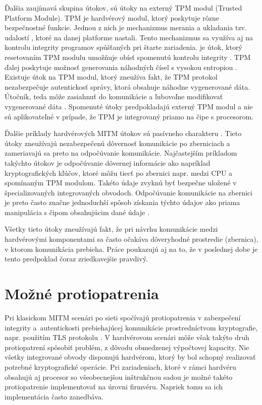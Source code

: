 Ďalšia zaujímavá skupina útokov, sú útoky na externý TPM modul (Trusted Platform Module). TPM je hardvérový modul, ktorý poskytuje rôzne bezpečnostné funkcie. Jednou z nich je mechanizmus merania a ukladania tzv. udalostí \cite{tpmArch}, ktoré na danej platforme nastali. Tento mechanizmus sa využíva aj na kontrolu integrity programov spúšťaných pri štarte zariadenia.  je útok, ktorý resetovaním TPM modulu umožňuje obísť spomenutú kontrolu integrity \cite{mitmTPM}. TPM ďalej poskytuje možnosť generovania náhodných čísel s vysokou entropiou \cite{tpmArch}. Existuje útok na TPM modul, ktorý zneužíva fakt, že TPM protokol nezabezpečuje autentickosť správy, ktorá obsahuje náhodne vygenerované dáta. Útočník, teda môže zasiahnuť do komunikácie a ľubovoľne modifikovať vygenerované dáta \cite{mitmTPM}. Spomenuté útoky predpokladajú externý TPM modul a nie sú aplikovateľné v prípade, že TPM je integrovaný priamo na čipe s procesorom.

Ďalšie príklady hardvérových MITM útokov sú pasívneho charakteru \cite{mitmI2C, mitmBitlocker}. Tieto útoky zneužívajú nezabezpečenú dôvernosť komunikácie po zberniciach a zameriavajú sa preto na odpočúvanie komunikácie. Najčastejším príkladom takýchto útokov je odpočúvanie dôvernej informácie ako napríklad kryptografických kľúčov, ktoré môžu tiecť po zbernici napr. medzi CPU a spomínaným TPM modulom. Takéto údaje zvyknú byť bezpečne uložené v špecializovaných integrovaných obvodoch. Odpočúvanie komunikácie na zbernici je preto často značne jednoduchší spôsob získania týchto údajov ako priama manipulácia s čipom obsahujúcim dané údaje \cite{mitmBitlocker}.

Všetky tieto útoky zneužívajú fakt, že pri návrhu komunikácie medzi hardvérovými komponentami sa často očakáva dôveryhodné prostredie (zbernica), v ktorom komunikácia prebieha. Práce poukazujú aj na to, že v poslednej dobe je tento predpoklad čoraz zriedkavejšie pravdivý.

\section{Možné protiopatrenia}
Pri klasickom MITM scenári po sieti spočívajú protiopatrenia v zabezpečení integrity a~autentickosti prebiehajúcej komunikácie prostredníctvom kryptografie, napr. použitím TLS protokolu \cite{mitmTheory}. V hardvérovom scenári môže však takýto druh protiopatrení spôsobiť problém, z dôvodu obmedzenej výpočtovej kapacity. Nie všetky integrované obvody disponujú hardvérom, ktorý by bol schopný realizovať potrebné kryptografické operácie. Pri zariadeniach, ktoré v rámci hardvéru obsahujú aj procesor so všeobecnejšou inštrukčnou sadou je možné takéto protiopatrenie implementovať na úrovni firmvéru. Napriek tomu sa ich implementácia často zanedbáva.

